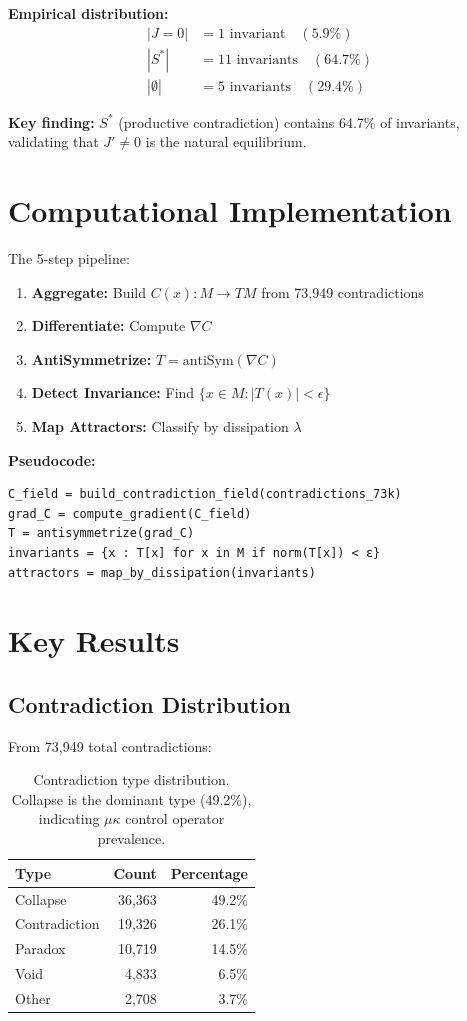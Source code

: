 \documentclass{article}
\begin{document}
\textbf{Empirical distribution:}
\begin{align*}
|J=0| &= 1 \text{ invariant} \quad (5.9\%) \\
|S^*| &= 11 \text{ invariants} \quad (64.7\%) \\
|\emptyset| &= 5 \text{ invariants} \quad (29.4\%)
\end{align*}

\textbf{Key finding:} $S^*$ (productive contradiction) contains 64.7\% of invariants, validating that $J' \neq 0$ is the natural equilibrium.

\section{Computational Implementation}

The 5-step pipeline:

\begin{enumerate}
    \item \textbf{Aggregate:} Build $C(x): M \to TM$ from 73,949 contradictions
    \item \textbf{Differentiate:} Compute $\nabla C$
    \item \textbf{AntiSymmetrize:} $T = \text{antiSym}(\nabla C)$
    \item \textbf{Detect Invariance:} Find $\{x \in M : |T(x)| < \epsilon\}$
    \item \textbf{Map Attractors:} Classify by dissipation $\lambda$
\end{enumerate}

\textbf{Pseudocode:}
\begin{verbatim}
C_field = build_contradiction_field(contradictions_73k)
grad_C = compute_gradient(C_field)
T = antisymmetrize(grad_C)
invariants = {x : T[x] for x in M if norm(T[x]) < ε}
attractors = map_by_dissipation(invariants)
\end{verbatim}

\section{Key Results}

\subsection{Contradiction Distribution}

From 73,949 total contradictions:

\begin{table}[h]
\centering
\begin{tabular}{lrr}
\hline
Type & Count & Percentage \\
\hline
Collapse & 36,363 & 49.2\% \\
Contradiction & 19,326 & 26.1\% \\
Paradox & 10,719 & 14.5\% \\
Void & 4,833 & 6.5\% \\
Other & 2,708 & 3.7\% \\
\hline
\end{tabular}
\caption{Contradiction type distribution. Collapse is the dominant type (49.2\%), indicating $\mu\kappa$ control operator prevalence.}
\end{table}
\end{document}
